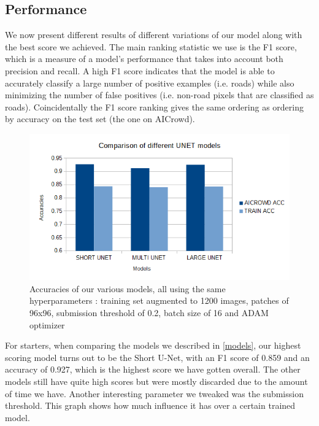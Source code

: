 \documentclass[10pt,conference,compsocconf]{IEEEtran}
\begin{document}
\subsection{Performance}
We now present different results of different variations of our model along with the best score we achieved. The main ranking statistic we use is the F1 score, which is a measure of a model's performance that takes into account both precision and recall. A high F1 score indicates that the model is able to accurately classify a large number of positive examples (i.e. roads) while also minimizing the number of false positives (i.e. non-road pixels that are classified as roads). Coincidentally the F1 score ranking gives the same ordering as ordering by accuracy on the test set (the one on AICrowd).
\begin{figure}[H]
    \centering
    \includegraphics[scale = 0.4]{models_graph.png} %
    \caption{Accuracies of our various models, all using the same hyperparameters : training set augmented to 1200 images, patches of 96x96, submission threshold of 0.2, batch size of 16 and ADAM optimizer}
\end{figure}
For starters, when comparing the models we described in \ref{models}, our highest scoring model turns out to be the Short U-Net, with an F1 score of 0.859 and an accuracy of 0.927, which is the highest score we have gotten overall. The other models still have quite high scores but were mostly discarded due to the amount of time we have.
\newline
Another interesting parameter we tweaked was the submission threshold. This graph shows how much influence it has over a certain trained model.
\end{document}
